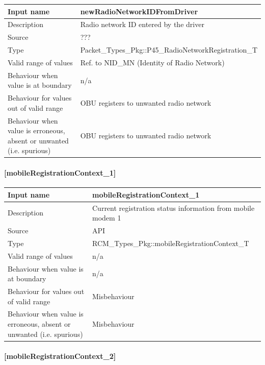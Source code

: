 \begin{longtable}{p{}p{}}
	\toprule
	Input name				& newRadioNetworkIDFromDriver \\
	\midrule
	Description				& Radio network ID entered by the driver \\
	\midrule
	Source					& ??? \\ 
	\midrule
	Type					& Packet\_Types\_Pkg::P45\_RadioNetworkRegistration\_T \\
	\midrule
	Valid range of values	& Ref. to NID\_MN (Identity of Radio Network)  \\
	\midrule
	Behaviour when value is at boundary	& n/a \\
	\midrule
	Behaviour for values out of valid range	& OBU registers to unwanted radio network \\
	\midrule
	Behaviour when value is erroneous, absent or unwanted (i.e. spurious) & OBU registers to unwanted radio network  \\
	\bottomrule
\end{longtable}

\paragraph{[mobileRegistrationContext\_1]}

\begin{longtable}{p{}p{}}
	\toprule
	Input name				& mobileRegistrationContext\_1 \\
	\midrule
	Description				& Current registration status information from mobile modem 1 \\
	\midrule
	Source					& API \\ 
	\midrule
	Type					& RCM\_Types\_Pkg::mobileRegistrationContext\_T \\
	\midrule
	Valid range of values	& n/a \\
	\midrule
	Behaviour when value is at boundary	& n/a \\
	\midrule
	Behaviour for values out of valid range	& Misbehaviour \\
	\midrule
	Behaviour when value is erroneous, absent or unwanted (i.e. spurious) & Misbehaviour \\
	\bottomrule
\end{longtable}

\paragraph{[mobileRegistrationContext\_2]}

